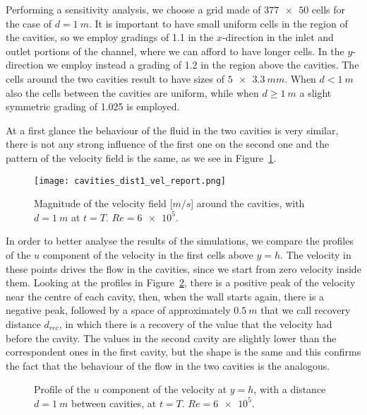 Performing a sensitivity analysis, we choose a grid made of $\num{377x50}$ cells for the case of $d=\SI{1}{m}$. It is important to have small uniform cells in the region of the cavities, so we employ gradings of 1.1 in the $x$-direction in the inlet and outlet portions of the channel, where we can afford to have longer cells. In the $y$-direction we employ instead a grading of 1.2 in the region above the cavities. The cells around the two cavities result to have sizes of $\SI{5x3.3}{mm}$. When $d<\SI{1}{m}$ also the cells between the cavities are uniform, while when $d\geq \SI{1}{m}$ a slight symmetric grading of 1.025 is employed.

At a first glance the behaviour of the fluid in the two cavities is very 
similar, there is not any strong influence of the first one on the second one 
and the pattern of the velocity field is the same, as we see in Figure~\ref{fig:veld1}. 
\begin{figure}
	\centering
	\texttt{[image: cavities\_dist1\_vel\_report.png]}
	\caption[Magnitude of the velocity field in the cavities problem]{Magnitude of the velocity field [$\si{m/s}$] around the cavities, with $d=\SI{1}{m}$ at $t=T$. $Re=\num{6e5}$.}
	\label{fig:veld1}
\end{figure}
In order to better analyse the results of the simulations, we compare the 
profiles of the $u$ component of the velocity in the first cells above $y=h$. The velocity in these points drives the flow in the cavities, 
since we start from zero velocity inside them. Looking at the profiles in Figure~\ref{fig:velprofile1}, there is a positive 
peak of the velocity near the centre of each cavity, then, when the wall starts 
again, there is a negative peak, followed by a space of approximately $\SI{0.5}{m}$ that we call recovery 
distance $d_{rec}$, in which there is a recovery 
of the value that the velocity had before the cavity. The values in the second 
cavity are slightly lower than the correspondent ones in the first cavity, but 
the shape is the same and this confirms the fact that the behaviour of the flow 
in the two cavities is the analogous.
\begin{figure}
	\centering
	
	\caption[Profile of the $u$ component of the velocity at $y=h$ in the cavities problem]{Profile of the $u$ component of the velocity at $y=h$, with a distance $d=\SI{1}{m}$ between cavities, at $t=T$. $Re = \num{6e5}$.}
	\label{fig:velprofile1}
\end{figure}

